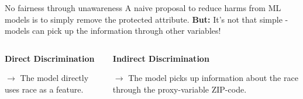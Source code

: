 \documentclass[11pt,compress,t,notes=noshow, xcolor=table]{beamer}
\begin{document}
\begin{vbframe}{No fairness through unawareness}
    A naive proposal to reduce harms from ML models is to simply remove the protected attribute.
    \textbf{But:} It's not that simple - models can pick up the information through other variables!
    \vspace{-.4cm}
    
    \begin{columns} 
        \begin{column}{0.5\textwidth}
            \begin{center}
                \textbf{Direct Discrimination}
                \vspace{.2cm}
            \end{center}
            \vfill
            
            $\rightarrow$ The model directly uses race as a feature.
            
        \end{column}
        \begin{column}{0.5\textwidth}
            \begin{center}
                \textbf{Indirect Discrimination}
                \vspace{.2cm}
            \end{center}
            \vfill
            $\rightarrow$ The model picks up information about the race through the proxy-variable ZIP-code.
        \end{column}
    \end{columns}
    \vfill
\end{vbframe}
\end{document}
